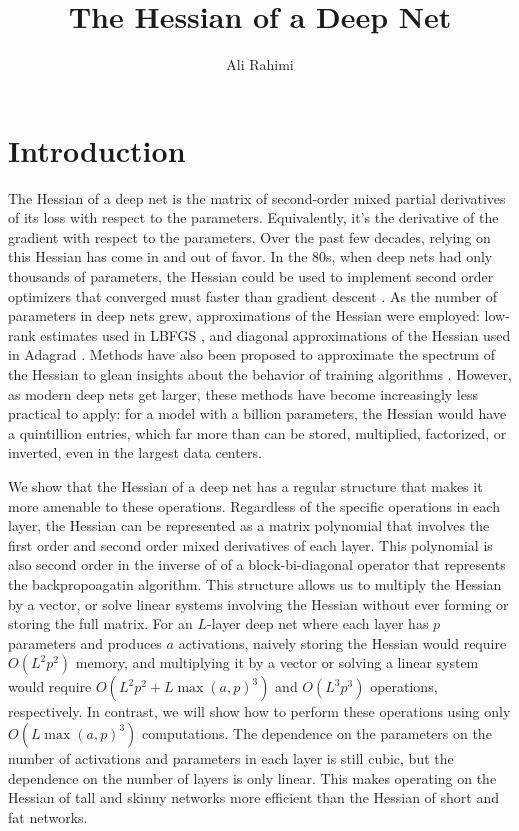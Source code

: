 \documentclass{article}
\title{The Hessian of a Deep Net}
\author{Ali Rahimi}
\begin{document}
\maketitle

\section{Introduction}

The Hessian of a deep net is the matrix of second-order mixed partial
derivatives of its loss with respect to the parameters. Equivalently, it's the
derivative of the gradient with respect to the parameters. Over the past few
decades, relying on this Hessian has come in and out of favor. In the 80s, when
deep nets had only thousands of parameters, the Hessian could be used to
implement second order optimizers that converged must faster than gradient
descent \cite{deep-net-second-order}. As the number of parameters in deep nets
grew, approximations of the Hessian were employed: low-rank estimates used in
LBFGS \cite{deep-net-lbfg}, and diagonal approximations of the Hessian used in
Adagrad \cite{adagrad}. Methods have also been proposed to approximate the
spectrum of the Hessian to glean insights about the behavior of training
algorithms \cite{ying-behrooz-hessian-spectrum}. However, as modern deep nets
get larger, these methods have become increasingly less practical to apply: for
a model with a billion parameters, the Hessian would have a quintillion
entries, which far more than can be stored, multiplied, factorized, or
inverted, even in the largest data centers.

We show that the Hessian of a deep net has a regular structure that makes it
more amenable to these operations. Regardless of the specific operations in
each layer, the Hessian can be represented as a matrix polynomial that involves
the first order and second order mixed derivatives of each layer. This
polynomial is also second order in the inverse of of a block-bi-diagonal
operator that represents the backpropoagatin algorithm. This structure allows
us to multiply the Hessian by a vector, or solve linear systems involving the
Hessian without ever forming or storing the full matrix. For an $L$-layer deep
net where each layer has $p$ parameters and produces $a$ activations, naively
storing the Hessian would require $O(L^2p^2)$ memory, and multiplying it by a
vector or solving a linear system would require $O(L^2p^2 + L\max(a,p)^3)$ and
$O(L^3p^3)$ operations, respectively. In contrast, we will show how to perform
these operations using only $O(L \max(a, p)^3)$ computations. The dependence on
the parameters on the number of activations and parameters in each layer is
still cubic, but the dependence on the number of layers is only linear. This
makes operating on the Hessian of tall and skinny networks more efficient than
the Hessian of short and fat networks.
\end{document}
